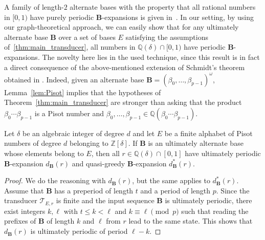 \documentclass[12pt,reqno]{amsart}
\newcommand\emilie[1]{\mbox{}
{\marginpar{\color{orange}E}}
{\sf\noindent\color{orange}[#1]}}
\newcommand{\B}{{\mathbf{B}}}
\begin{document}
A family of length-$2$ alternate bases with the property that all rational numbers in $[0,1)$ have purely periodic $\B$-expansions is given in~\cite{MP}. In our setting, by using our graph-theoretical approach, we can easily show that for any ultimately alternate base $\B$ over a set of bases $E$ satisfying the assumptions of~\cref{thm:main_transducer}, all numbers in $\mathbb{Q}(\delta)\cap [0,1)$ have periodic $\B$-expansions. The novelty here lies in the used technique, since this result is in fact a direct consequence of the above-mentioned extension of Schmidt's theorem obtained in \cite{CCK}. Indeed, given an alternate base $\B=(\beta_0,\ldots,\beta_{p-1})^\omega$, Lemma~\ref{lem:Pisot} implies that the hypotheses of Theorem~\ref{thm:main_transducer} are stronger than asking that the product $\beta_0\cdots\beta_{p-1}$ is a Pisot number and $\beta_0,\ldots,\beta_{p-1}\in\mathbb{Q}(\beta_0\cdots\beta_{p-1})$.

\begin{corollary} 
\label{cor:AlternateBase-implies-Periodicity}
 Let $\delta$ be an algebraic integer of degree $d$ and let $E$ be a finite alphabet of Pisot numbers of degree $d$ belonging to $\mathbb{Z}[\delta]$. 
 If $\B$ is an ultimately alternate base whose elements belong to $E$, then all $r\in\mathbb{Q}(\delta)\cap [0,1]$ have ultimately periodic $\B$-expansion $d_\B(r)$ and quasi-greedy $\B$-expansion $d_\B^*(r)$. 
\end{corollary}
  
\begin{proof}
We do the reasoning with $d_\B(r)$, but the same applies to $d_\B^*(r)$.
Assume that $\B$ has a preperiod of length $t$ and a period of length $p$. Since the transducer $\mathcal{T}_{E,r}$ is finite and the input sequence $\B$ is ultimately periodic, there exist integers $k,\ell$ with $t\le k<\ell$ and $k\equiv \ell\pmod p$ such that reading the prefixes of $\B$ of length $k$ and $\ell$ from $r$ lead to the same state. This shows that $d_\B(r)$ is ultimately periodic of period $\ell-k$. 
\end{proof}

\end{document}
